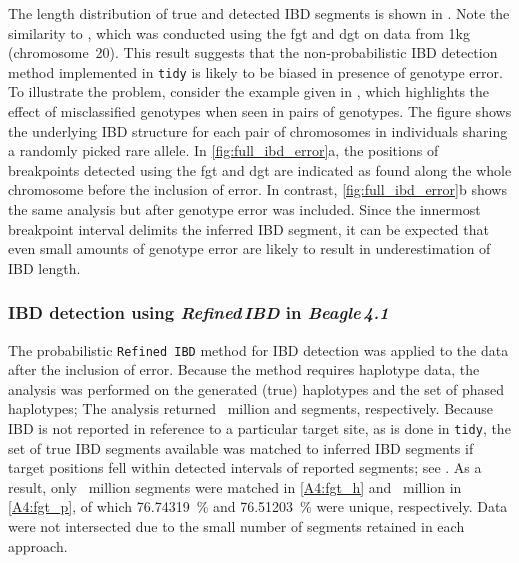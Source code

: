 The length distribution of true and detected IBD segments is shown in .
Note the similarity to , which was conducted using the \gls{fgt} and \gls{dgt} on data from \gls{1kg} (chromosome~20).
This result suggests that the non-probabilistic IBD detection method implemented in \texttt{tidy} is likely to be biased in presence of genotype error.
To illustrate the problem, consider the example given in , which highlights the effect of misclassified genotypes when seen in pairs of genotypes.
The figure shows the underlying IBD structure for each pair of chromosomes in  individuals sharing a randomly picked rare allele.
In \cref{fig:full_ibd_error}{a}, the positions of breakpoints detected using the \gls{fgt} and \gls{dgt} are indicated as found along the whole chromosome before the inclusion of error.
In contrast, \cref{fig:full_ibd_error}{b} shows the same analysis but after genotype error was included.
Since the innermost breakpoint interval delimits the inferred IBD segment, it can be expected that even small amounts of genotype error are likely to result in underestimation of IBD length.


%
\subsubsection{IBD detection using \emph{Refined\,IBD} in \emph{Beagle\,4.1}}
%

The probabilistic \texttt{Refined\,IBD} method for IBD detection was applied to the data after the inclusion of error.
Because the method requires haplotype data, the analysis was performed on the generated (true) haplotypes and the set of phased haplotypes; 
The analysis returned ~million and  segments, respectively.
Because IBD is not reported in reference to a particular target site, as is done in \texttt{tidy}, the set of true IBD segments available was matched to inferred IBD segments if target positions fell within detected intervals of reported segments; see .
As a result, only ~million segments were matched in \ref{A4:fgt_h} and ~million in \ref{A4:fgt_p}, of which \SI{76.74319}{\percent} and \SI{76.51203}{\percent} were unique, respectively.
Data were not intersected due to the small number of segments retained in each approach.

%

%

